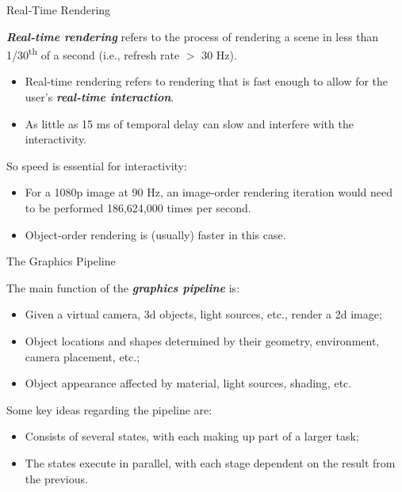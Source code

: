 \documentclass{beamer}
\newcommand{\emphbf}[1]{\textbf{\emph{#1}}}
\begin{document}
\begin{frame}{Real-Time Rendering}

	\emphbf{Real-time rendering} refers to the process of rendering a scene in less than 1/30\textsuperscript{th} of a second (i.e., refresh rate $>$ 30 Hz).

	\begin{itemize}
		\item Real-time rendering refers to rendering that is fast enough to allow for the user's \emphbf{real-time interaction}.
		\item As little as 15 ms of temporal delay can slow and interfere with the interactivity.
	\end{itemize}

	\vskip 1cm

	So speed is essential for interactivity:

	\begin{itemize}
		\item For a 1080p image at 90 Hz, an image-order rendering iteration would need to be performed 186,624,000 times per second.
		\item Object-order rendering is (usually) faster in this case.
	\end{itemize}

\end{frame}

\begin{frame}{The Graphics Pipeline}

	The main function of the \emphbf{graphics pipeline} is:

	\begin{itemize}
		\item Given a virtual camera, 3d objects, light sources, etc., render a 2d image;
		\item Object locations and shapes determined by their geometry, environment,  camera placement, etc.;
		\item Object appearance affected by material, light sources, shading, etc.
	\end{itemize}

	\vskip 1cm

	Some key ideas regarding the pipeline are:

	\begin{itemize}
		\item Consists of several states, with each making up part of a larger task;
		\item The states execute in parallel, with each stage dependent on the result from the previous.
	\end{itemize}

\end{frame}
\end{document}

